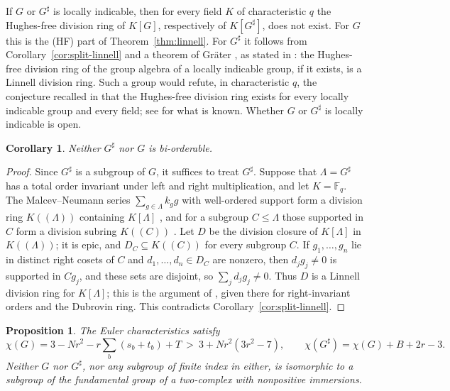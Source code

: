 \documentclass[11pt]{article}
\newtheorem{proposition}[theorem]{Proposition}
\newtheorem{corollary}[theorem]{Corollary}
\theoremstyle{definition}
\theoremstyle{remark}
\numberwithin{equation}{section}
\newcommand{\F}{\mathbb F}
\begin{document}
If $G$ or $G^\sharp$ is locally indicable, then for every field $K$ of characteristic $q$ the Hughes-free division ring of $K[G]$, respectively of $K[G^\sharp]$, does not exist. For $G$ this is the (HF) part of Theorem~\ref{thm:linnell}. For $G^\sharp$ it follows from Corollary~\ref{cor:split-linnell} and a theorem of Gr\"ater \cite{Grater2020}, as stated in \cite[Theorem~2.5]{JZL2025}: the Hughes-free division ring of the group algebra of a locally indicable group, if it exists, is a Linnell division ring. Such a group would refute, in characteristic $q$, the conjecture recalled in \cite[Section~2.3]{JZL2025} that the Hughes-free division ring exists for every locally indicable group and every field; see \cite{JZ2021} for what is known. Whether $G$ or $G^\sharp$ is locally indicable is open.

\begin{corollary}\label{cor:biorder}
Neither $G^\sharp$ nor $G$ is bi-orderable.
\end{corollary}

\begin{proof}
Since $G^\sharp$ is a subgroup of $G$, it suffices to treat $G^\sharp$. Suppose that $\Lambda=G^\sharp$ has a total order invariant under left and right multiplication, and let $K=\F_q$. The Malcev--Neumann series $\sum_{g\in\Lambda}k_gg$ with well-ordered support form a division ring $K((\Lambda))$ containing $K[\Lambda]$ \cite{Malcev1948,Neumann1949}, and for a subgroup $C\le\Lambda$ those supported in $C$ form a division subring $K((C))$ \cite[Section~1.3]{Sanchez2011}. Let $D$ be the division closure of $K[\Lambda]$ in $K((\Lambda))$; it is epic, and $D_C\subseteq K((C))$ for every subgroup $C$. If $g_1,\dots,g_n$ lie in distinct right cosets of $C$ and $d_1,\dots,d_n\in D_C$ are nonzero, then $d_jg_j\ne0$ is supported in $Cg_j$, and these sets are disjoint, so $\sum_jd_jg_j\ne0$. Thus $D$ is a Linnell division ring for $K[\Lambda]$; this is the argument of \cite[Proposition~2.4]{JZL2025}, given there for right-invariant orders and the Dubrovin ring. This contradicts Corollary~\ref{cor:split-linnell}.
\end{proof}

\begin{proposition}\label{prop:euler}
The Euler characteristics satisfy
\[
 \chi(G)=3-Nr^2-r\sum_b(s_b+t_b)+T\ >\ 3+Nr^2(3r^2-7),\qquad \chi(G^\sharp)=\chi(G)+B+2r-3.
\]
Neither $G$ nor $G^\sharp$, nor any subgroup of finite index in either, is isomorphic to a subgroup of the fundamental group of a two-complex with nonpositive immersions.
\end{proposition}
\end{document}
